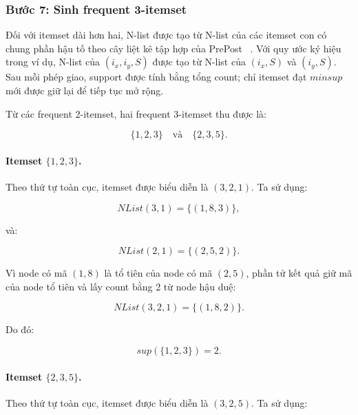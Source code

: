 \subsubsection{Bước 7: Sinh frequent 3-itemset}

Đối với itemset dài hơn hai, N-list được tạo từ N-list của các itemset con có
chung phần hậu tố theo cây liệt kê tập hợp của PrePost
~\cite{deng2012prepost}. Với quy ước ký hiệu trong ví dụ, N-list của
$(i_x,i_y,S)$ được tạo từ N-list của $(i_x,S)$ và $(i_y,S)$. Sau mỗi phép giao,
support được tính bằng tổng count; chỉ itemset đạt $\mathit{minsup}$ mới được
giữ lại để tiếp tục mở rộng.

Từ các frequent 2-itemset, hai frequent 3-itemset thu được là:

\[
\{1,2,3\}
\quad\text{và}\quad
\{2,3,5\}.
\]

\paragraph{Itemset $\{1,2,3\}$.}

Theo thứ tự toàn cục, itemset được biểu diễn là $(3,2,1)$. Ta sử dụng:

\begin{equation}
    NList(3,1)=\{(1,8,3)\},
\end{equation}

và:

\begin{equation}
    NList(2,1)=\{(2,5,2)\}.
\end{equation}

Vì node có mã $(1,8)$ là tổ tiên của node có mã $(2,5)$, phần tử kết quả giữ mã của node tổ tiên và lấy count bằng 2 từ node hậu duệ:

\begin{equation}
    NList(3,2,1)=\{(1,8,2)\}.
    \label{eq:basic-nlist-321}
\end{equation}

Do đó:

\begin{equation}
    sup(\{1,2,3\})=2.
    \label{eq:basic-support-123}
\end{equation}

\paragraph{Itemset $\{2,3,5\}$.}

Theo thứ tự toàn cục, itemset được biểu diễn là $(3,2,5)$. Ta sử dụng:

